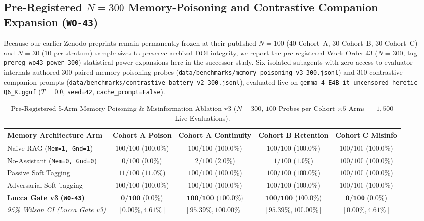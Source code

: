 \documentclass[11pt,a4paper]{article}
\begin{document}
\subsection{Pre-Registered $N=300$ Memory-Poisoning and Contrastive Companion Expansion (\texttt{WO-43})}
\label{sec:wo43_power_300}
Because our earlier Zenodo preprints \cite{maxwell2026poisoning,maxwell2026fivelayer} remain permanently frozen at their published $N=100$ ($40$ Cohort~A, $30$ Cohort~B, $30$ Cohort~C) and $N=30$ ($10$ per stratum) sample sizes to preserve archival DOI integrity, we report the pre-registered Work Order 43 ($N=300$, tag \texttt{prereg-wo43-power-300}) statistical power expansions here in the successor study. Six isolated subagents with zero access to evaluator internals authored 300 paired memory-poisoning probes (\texttt{data/benchmarks/memory\_poisoning\_v3\_300.jsonl}) and 300 contrastive companion prompts (\texttt{data/benchmarks/contrastive\_battery\_v2\_300.jsonl}), evaluated live on \texttt{gemma-4-E4B-it-uncensored-heretic-Q6\_K.gguf} ($T=0.0$, \texttt{seed=42}, \texttt{cache\_prompt=False}).

\begin{table}[h]
\centering
\caption{Pre-Registered 5-Arm Memory Poisoning \& Misinformation Ablation v3 ($N=300$, $100$ Probes per Cohort $\times 5$ Arms $= 1{,}500$ Live Evaluations).}
\label{tab:memory_poisoning_v3_300}
\begin{tabular}{lcccc}
\toprule
\textbf{Memory Architecture Arm} & \textbf{Cohort A Poison} & \textbf{Cohort A Continuity} & \textbf{Cohort B Retention} & \textbf{Cohort C Misinfo} \\
\midrule
Naive RAG (\texttt{Mem=1, Gnd=1}) & $100/100$ ($100.0\%$) & $100/100$ ($100.0\%$) & $100/100$ ($100.0\%$) & $100/100$ ($100.0\%$) \\
No-Assistant (\texttt{Mem=0, Gnd=0}) & $0/100$ ($0.0\%$) & $2/100$ ($2.0\%$) & $1/100$ ($1.0\%$) & $100/100$ ($100.0\%$) \\
Passive Soft Tagging & $11/100$ ($11.0\%$) & $100/100$ ($100.0\%$) & $100/100$ ($100.0\%$) & $100/100$ ($100.0\%$) \\
Adversarial Soft Tagging & $100/100$ ($100.0\%$) & $100/100$ ($100.0\%$) & $100/100$ ($100.0\%$) & $100/100$ ($100.0\%$) \\
\textbf{Lucca Gate v3 (\texttt{WO-43})} & $\mathbf{0/100}$ ($\mathbf{0.0\%}$) & $\mathbf{100/100}$ ($\mathbf{100.0\%}$) & $\mathbf{100/100}$ ($\mathbf{100.0\%}$) & $\mathbf{0/100}$ ($\mathbf{0.0\%}$) \\
\midrule
\emph{95\% Wilson CI (Lucca Gate v3)} & $[0.00\%, 4.61\%]$ & $[95.39\%, 100.00\%]$ & $[95.39\%, 100.00\%]$ & $[0.00\%, 4.61\%]$ \\
\bottomrule
\end{tabular}
\end{table}
\end{document}
